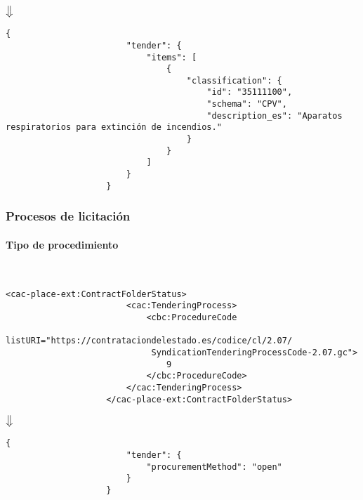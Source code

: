                 \begin{center}
                    $\big\Downarrow$
                \end{center}
                
                \begin{lstlisting}[language=lJSON]
                    {
                        "tender": {
                            "items": [
                                {
                                    "classification": {
                                        "id": "35111100",
                                        "schema": "CPV",
                                        "description_es": "Aparatos respiratorios para extinción de incendios."
                                    }
                                }
                            ]
                        }
                    }
                \end{lstlisting}
                
        \subsubsection{Procesos de licitación}
            \paragraph{Tipo de procedimiento} \mbox{}\\
                \begin{lstlisting}[language=lXML]
                    <cac-place-ext:ContractFolderStatus>
                        <cac:TenderingProcess>
                            <cbc:ProcedureCode
                             listURI="https://contrataciondelestado.es/codice/cl/2.07/
                             SyndicationTenderingProcessCode-2.07.gc">
                                9
                            </cbc:ProcedureCode>
                        </cac:TenderingProcess>
                    </cac-place-ext:ContractFolderStatus>
                \end{lstlisting}
                
                \begin{center}
                    $\big\Downarrow$
                \end{center}
                
                \begin{lstlisting}[language=lJSON]
                    {
                        "tender": {
                            "procurementMethod": "open"
                        }
                    }
                \end{lstlisting}
                
